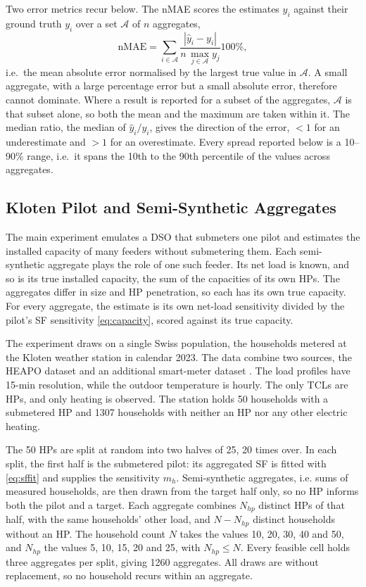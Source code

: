 Two error metrics recur below. The nMAE scores the estimates $\hat{y}_i$ against their ground truth $y_i$ over a set $\mathcal{A}$ of $n$ aggregates,
\begin{equation}
	\mathrm{nMAE} =\sum_{i\in\mathcal{A}} \frac{ |\hat{y}_i - y_i|}{n\,\max_{j\in\mathcal{A}} y_j}100\%,
	\label{eq:nmae}
\end{equation}
i.e.\ the mean absolute error normalised by the largest true value in $\mathcal{A}$. A small aggregate, with a large percentage error but a small absolute error, therefore cannot dominate. Where a result is reported for a subset of the aggregates, $\mathcal{A}$ is that subset alone, so both the mean and the maximum are taken within it. The median ratio, the median of $\hat{y}_i / y_i$, gives the direction of the error, $< 1$ for an underestimate and $> 1$ for an overestimate. Every spread reported below is a 10--90\% range, i.e.\ it spans the 10th to the 90th percentile of the values across aggregates.

\subsection{Kloten Pilot and Semi-Synthetic Aggregates}
\label{sec:data-kloten}

The main experiment emulates a DSO that submeters one pilot and estimates the installed capacity of many feeders without submetering them. Each semi-synthetic aggregate plays the role of one such feeder. Its net load is known, and so is its true installed capacity, the sum of the capacities of its own HPs. The aggregates differ in size and HP penetration, so each has its own true capacity. For every aggregate, the estimate is its own net-load sensitivity divided by the pilot's SF sensitivity \eqref{eq:capacity}, scored against its true capacity.

The experiment draws on a single Swiss population, the households metered at the Kloten weather station in calendar 2023. The data combine two sources, the HEAPO dataset \cite{Bru25} and an additional smart-meter dataset \cite{Kai26b}. The load profiles have 15-min resolution, while the outdoor temperature is hourly. The only TCLs are HPs, and only heating is observed. The station holds 50 households with a submetered HP and 1307 households with neither an HP nor any other electric heating.

The 50 HPs are split at random into two halves of 25, 20 times over. In each split, the first half is the submetered pilot: its aggregated SF is fitted with \eqref{eq:sffit} and supplies the sensitivity $m_h$. Semi-synthetic aggregates, i.e. sums of measured households, are then drawn from the target half only, so no HP informs both the pilot and a target. Each aggregate combines $N_{hp}$ distinct HPs of that half, with the same households' other load, and $N - N_{hp}$ distinct households without an HP. The household count $N$ takes the values 10, 20, 30, 40 and 50, and $N_{hp}$ the values 5, 10, 15, 20 and 25, with $N_{hp} \le N$. Every feasible cell holds three aggregates per split, giving 1260 aggregates. All draws are without replacement, so no household recurs within an aggregate.

